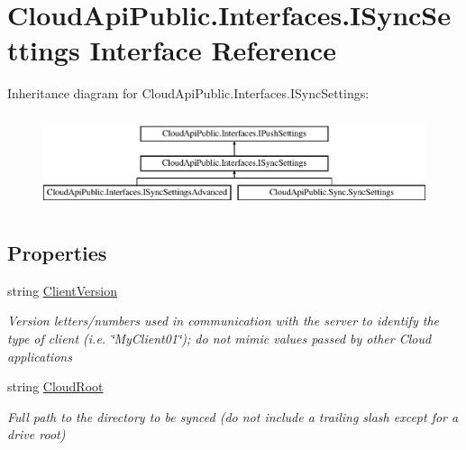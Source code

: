 \hypertarget{interface_cloud_api_public_1_1_interfaces_1_1_i_sync_settings}{\section{Cloud\-Api\-Public.\-Interfaces.\-I\-Sync\-Settings Interface Reference}
\label{interface_cloud_api_public_1_1_interfaces_1_1_i_sync_settings}
}
Inheritance diagram for Cloud\-Api\-Public.\-Interfaces.\-I\-Sync\-Settings\-:\begin{figure}[H]
\begin{center}
\leavevmode
\includegraphics[height=2.754098cm]{interface_cloud_api_public_1_1_interfaces_1_1_i_sync_settings}
\end{center}
\end{figure}
\subsection*{Properties}
\begin{DoxyCompactItemize}
\item 
string \hyperlink{interface_cloud_api_public_1_1_interfaces_1_1_i_sync_settings_a10e2af418073326f5ff218b13faee6c6}{Client\-Version}
\begin{DoxyCompactList}\small\item\em Version letters/numbers used in communication with the server to identify the type of client (i.\-e. \char`\"{}\-My\-Client01\char`\"{}); do not mimic values passed by other Cloud applications \end{DoxyCompactList}\item 
string \hyperlink{interface_cloud_api_public_1_1_interfaces_1_1_i_sync_settings_ad67dd7a8c6a5d14d0685532f8344a4ae}{Cloud\-Root}
\begin{DoxyCompactList}\small\item\em Full path to the directory to be synced (do not include a trailing slash except for a drive root) \end{DoxyCompactList}\end{DoxyCompactItemize}


